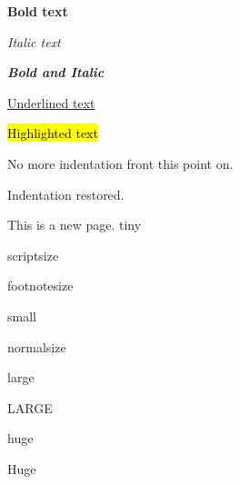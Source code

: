 \documentclass[11pt]{article}    %
\begin{document}
\textbf{Bold text}

\textit{Italic text}

\textbf{\textit{Bold and Italic}}

\underline{Underlined text}

\hl{Highlighted text}

\vspace{1cm}

\noindent
No more indentation front this point on.

\vspace{1cm}
\indent
Indentation restored.
\vspace{1cm}


\newpage
This is a new page.
\vspace{1cm}
\tiny{tiny}

\scriptsize{scriptsize}

\footnotesize{footnotesize}

\small{small}

\normalsize{normalsize}

\large{large}

\LARGE{LARGE}

\huge{huge}

\Huge{Huge}
\end{document}
